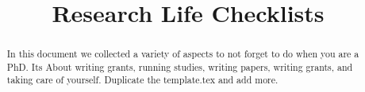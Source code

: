 \documentclass[14pt, a5paper]{extarticle}
\title{Research Life Checklists}
\date{}
\begin{document}
\selectfont
\maketitle
\begin{abstract}
    In this document we collected a variety of aspects to not forget to do when you are a PhD. Its About writing grants, running studies, writing papers, writing grants, and taking care of yourself. Duplicate the template.tex and add more.
\end{abstract}
\tableofcontents
\centering
\newpage














\end{document}
